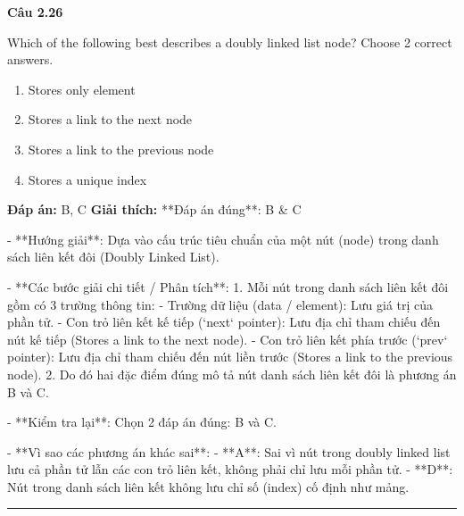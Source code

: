 \documentclass[11pt,a4paper]{article}
\newenvironment{question}[1]{%
  \par\vspace{1em}\noindent\textbf{\large Câu #1}\par\vspace{0.4em}
}{%
  \par\vspace{1em}\hrule\vspace{0.6em}
}
\newenvironment{choices}{%
  \begin{enumerate}[label=\textbf{\Alph*.},leftmargin=2.2em,itemsep=2pt,topsep=3pt]
}{%
  \end{enumerate}
}
\newcommand{\choice}{\item}
\begin{document}
\begin{question}{2.26}
Which of the following best describes a doubly linked list node? Choose 2 correct answers.
\begin{choices}
\choice Stores only element
\choice Stores a link to the next node
\choice Stores a link to the previous node
\choice Stores a unique index
\end{choices}
\textbf{Đáp án:} B, C
\textbf{Giải thích:} **Đáp án đúng**: B & C

- **Hướng giải**:
  Dựa vào cấu trúc tiêu chuẩn của một nút (node) trong danh sách liên kết đôi (Doubly Linked List).

- **Các bước giải chi tiết / Phân tích**:
  1. Mỗi nút trong danh sách liên kết đôi gồm có 3 trường thông tin:
     - Trường dữ liệu (data / element): Lưu giá trị của phần tử.
     - Con trỏ liên kết kế tiếp (`next` pointer): Lưu địa chỉ tham chiếu đến nút kế tiếp (Stores a link to the next node).
     - Con trỏ liên kết phía trước (`prev` pointer): Lưu địa chỉ tham chiếu đến nút liền trước (Stores a link to the previous node).
  2. Do đó hai đặc điểm đúng mô tả nút danh sách liên kết đôi là phương án B và C.

- **Kiểm tra lại**:
  Chọn 2 đáp án đúng: B và C.

- **Vì sao các phương án khác sai**:
  - **A**: Sai vì nút trong doubly linked list lưu cả phần tử lẫn các con trỏ liên kết, không phải chỉ lưu mỗi phần tử.
  - **D**: Nút trong danh sách liên kết không lưu chỉ số (index) cố định như mảng.
\end{question}
\end{document}
